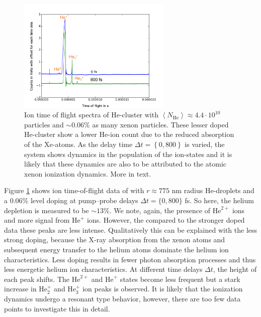 \begin{figure}
 	\centering
 		\includegraphics[width=0.65\textwidth]{images/results/TOF-helium-xenon-cluster-13.png}
 	\caption[TOF spectra of HeXe-cluster with $\sim 0.06\%$ Xe-doping at various delays $\Delta t$.]{Ion time of flight spectra of He-cluster with $\left\langle N_{\text{He}}\right\rangle\approx 4.4\cdot 10^{10}$ particles and $\sim 0.06\%$ as many xenon particles. These lesser doped He-cluster show a lower He-ion count due to the reduced absorption of the Xe-atoms. As the delay time $\Delta t=\left\{0,800\right\}$ is varied, the system shows dynamics in the population of the ion-states and it is likely  that these dynamics are also to be attributed to the atomic xenon ionization dynamics. More in text.}
 	\label{fig:TOF-helium-xenon-cluster-13}
\end{figure}
Figure \ref{fig:TOF-helium-xenon-cluster-13} shows ion time-of-flight data of with $r\approx 775$ nm radius He-droplets and a $0.06 \%$ level doping at pump--probe delays $\Delta t=\{0, 800\}$ fs. So here, the helium depletion is measured to be $\sim 13\%$. We note, again, the presence of $\text{He}^{2+}$ ions and more signal from $\text{He}^{+}$ ions. However, the compared to the stronger doped data these peaks are less intense. Qualitatively this can be explained with the less strong doping, because the X-ray absorption from the xenon atoms and subsequent energy transfer to the helium atoms dominate the helium ion characteristics. Less doping results in fewer photon absorption processes and thus less energetic helium ion characteristics. At different time delays $\Delta t$, the height of each peak shifts. The $\text{He}^{2+}$ and $\text{He}^{+}$ states become less frequent but a stark increase in $\text{He}_{2}^{+}$ and $\text{He}_{3}^{+}$ ion peaks is observed. It is likely that the ionization dynamics undergo a resonant type behavior, however, there are too few data points to investigate this in detail.\\
